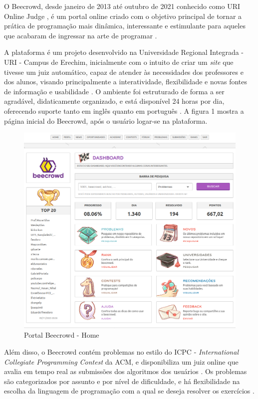 O Beecrowd, desde janeiro de 2013 até outubro de 2021 conhecido como URI Online Judge \cite[p.~5]{piekarski}, é um portal online criado com o objetivo principal de tornar a prática de programação mais dinâmica, interessante e estimulante para aqueles que acabaram de ingressar na arte de programar \cite[p.~1]{beztonin2012}.

A plataforma é um projeto desenvolvido na Universidade Regional Integrada - URI - Campus de Erechim, inicialmente com o intuito de criar um \textit{site} que tivesse um juiz automático, capaz de atender às necessidades dos professores e dos alunos, visando principalmente a interatividade, flexibilidade e novas fontes de informação e usabilidade \cite[p.~1]{beztonin2012}. O ambiente foi estruturado de forma a ser agradável, didaticamente organizado, e está disponível 24 horas por dia, oferecendo suporte tanto em inglês quanto em português \cite[p.~239]{beztonin2014}. A figura 1 mostra a página inicial do Beecrowd, após o usuário logar-se na plataforma.

\begin{figure}[h!]
	   \centering
            \caption{Portal Beecrowd - Home}
            \label{fig:BeecrowdHome}
	   	\includegraphics[scale=0.3]{pictures/beecrowd_home.png}
\end{figure}

Além disso, o Beecrowd contém problemas no estilo do ICPC - \textit{International Collegiate Programming Contest} da ACM, e disponibiliza um juiz online que avalia em tempo real as submissões dos algoritmos dos usuários \cite[p.~350]{berssanettefrancisco}. Os problemas são categorizados por assunto e por nível de dificuldade, e há flexibilidade na escolha da linguagem de programação com a qual se deseja resolver os exercícios \cite[p.~1]{beztonin2012}.

